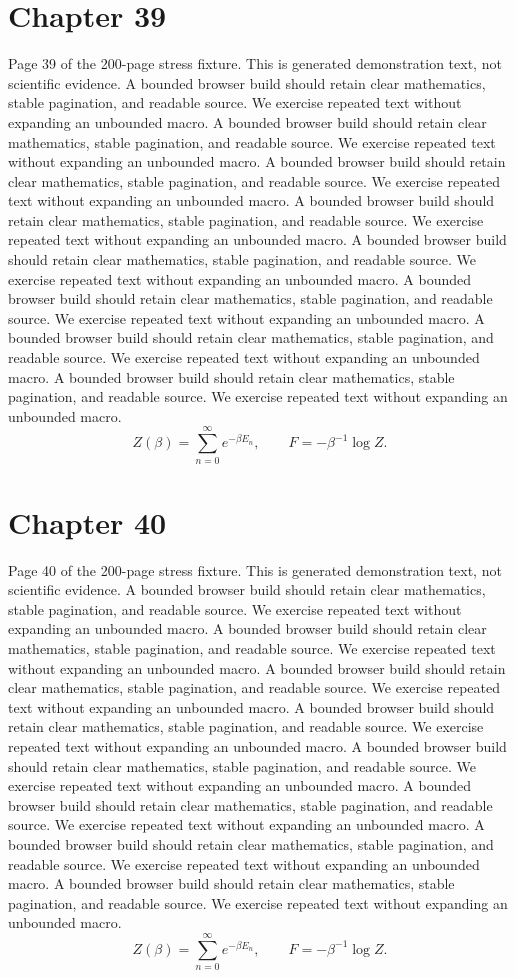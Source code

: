 \documentclass[11pt]{article}
\begin{document}
\section*{Chapter 39}
Page 39 of the 200-page stress fixture. This is generated demonstration text, not scientific evidence.
A bounded browser build should retain clear mathematics, stable pagination, and readable source. We exercise repeated text without expanding an unbounded macro.
A bounded browser build should retain clear mathematics, stable pagination, and readable source. We exercise repeated text without expanding an unbounded macro.
A bounded browser build should retain clear mathematics, stable pagination, and readable source. We exercise repeated text without expanding an unbounded macro.
A bounded browser build should retain clear mathematics, stable pagination, and readable source. We exercise repeated text without expanding an unbounded macro.
A bounded browser build should retain clear mathematics, stable pagination, and readable source. We exercise repeated text without expanding an unbounded macro.
A bounded browser build should retain clear mathematics, stable pagination, and readable source. We exercise repeated text without expanding an unbounded macro.
A bounded browser build should retain clear mathematics, stable pagination, and readable source. We exercise repeated text without expanding an unbounded macro.
A bounded browser build should retain clear mathematics, stable pagination, and readable source. We exercise repeated text without expanding an unbounded macro.
\[Z(\beta)=\sum_{n=0}^{\infty}e^{-\beta E_n},\qquad F=-\beta^{-1}\log Z.\]
\newpage
\section*{Chapter 40}
Page 40 of the 200-page stress fixture. This is generated demonstration text, not scientific evidence.
A bounded browser build should retain clear mathematics, stable pagination, and readable source. We exercise repeated text without expanding an unbounded macro.
A bounded browser build should retain clear mathematics, stable pagination, and readable source. We exercise repeated text without expanding an unbounded macro.
A bounded browser build should retain clear mathematics, stable pagination, and readable source. We exercise repeated text without expanding an unbounded macro.
A bounded browser build should retain clear mathematics, stable pagination, and readable source. We exercise repeated text without expanding an unbounded macro.
A bounded browser build should retain clear mathematics, stable pagination, and readable source. We exercise repeated text without expanding an unbounded macro.
A bounded browser build should retain clear mathematics, stable pagination, and readable source. We exercise repeated text without expanding an unbounded macro.
A bounded browser build should retain clear mathematics, stable pagination, and readable source. We exercise repeated text without expanding an unbounded macro.
A bounded browser build should retain clear mathematics, stable pagination, and readable source. We exercise repeated text without expanding an unbounded macro.
\[Z(\beta)=\sum_{n=0}^{\infty}e^{-\beta E_n},\qquad F=-\beta^{-1}\log Z.\]
\newpage
\end{document}
